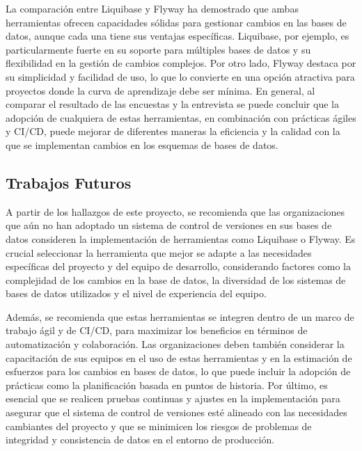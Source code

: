 \documentclass{IEEEtran}
\begin{document}
La comparación entre Liquibase y Flyway ha demostrado que ambas herramientas ofrecen capacidades sólidas para gestionar cambios en las bases de datos, aunque cada una tiene sus ventajas específicas. Liquibase, por ejemplo, es particularmente fuerte en su soporte para múltiples bases de datos y su flexibilidad en la gestión de cambios complejos. Por otro lado, Flyway destaca por su simplicidad y facilidad de uso, lo que lo convierte en una opción atractiva para proyectos donde la curva de aprendizaje debe ser mínima. En general, al comparar el resultado de las encuestas y la entrevista se puede concluir que la adopción de cualquiera de estas herramientas, en combinación con prácticas ágiles y CI/CD, puede mejorar de diferentes maneras la eficiencia y la calidad con la que se implementan cambios en los esquemas de bases de datos.


\subsection{Trabajos Futuros}
A partir de los hallazgos de este proyecto, se recomienda que las organizaciones que aún no han adoptado un sistema de control de versiones en sus bases de datos consideren la implementación de herramientas como Liquibase o Flyway. Es crucial seleccionar la herramienta que mejor se adapte a las necesidades específicas del proyecto y del equipo de desarrollo, considerando factores como la complejidad de los cambios en la base de datos, la diversidad de los sistemas de bases de datos utilizados y el nivel de experiencia del equipo. 

Además, se recomienda que estas herramientas se integren dentro de un marco de trabajo ágil y de CI/CD, para maximizar los beneficios en términos de automatización y colaboración. Las organizaciones deben también considerar la capacitación de sus equipos en el uso de estas herramientas y en la estimación de esfuerzos para los cambios en bases de datos, lo que puede incluir la adopción de prácticas como la planificación basada en puntos de historia. 
Por último, es esencial que se realicen pruebas continuas y ajustes en la implementación para asegurar que el sistema de control de versiones esté alineado con las necesidades cambiantes del proyecto y que se minimicen los riesgos de problemas de integridad y consistencia de datos en el entorno de producción.



\renewcommand{\refname}{Referencias}
\nocite{}



    
\end{document}
